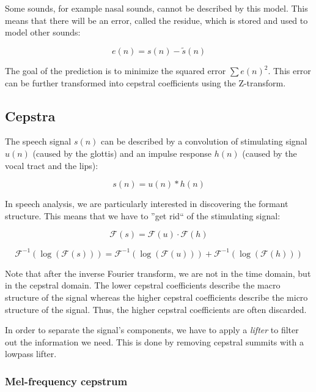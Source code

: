 \documentclass[11pt]{article}
\begin{document}
Some sounds, for example nasal sounds, cannot be described by this model. This means that there will be an error, called the residue, which is stored and used to model other sounds:

\begin{equation}
    e(n) = s(n) - \tilde{s}(n)
\end{equation}

The goal of the prediction is to minimize the squared error $\sum e(n)^2$. This error can be further transformed into cepstral coefficients using the Z-transform.

\subsection{Cepstra}

The speech signal $s(n)$ can be described by a convolution of stimulating signal $u(n)$ (caused by the glottis) and an impulse response $h(n)$ (caused by the vocal tract and the lips):

\begin{equation}
    s(n) = u(n) \ast h(n)
\end{equation}

In speech analysis, we are particularly interested in discovering the formant structure. This means that we have to ''get rid`` of the stimulating signal:

\begin{equation}
    \mathcal{F}(s) = \mathcal{F}(u) \cdot \mathcal{F}(h)
\end{equation}

\begin{equation}
    \mathcal{F}^{-1}(\log(\mathcal{F}(s))) = \mathcal{F}^{-1}(\log(\mathcal{F}(u))) + \mathcal{F}^{-1}(\log(\mathcal{F}(h)))
\end{equation}

Note that after the inverse Fourier transform, we are not in the time domain, but in the cepstral domain. The lower cepstral coefficients describe the macro structure of the signal whereas the higher cepstral coefficients describe the micro structure of the signal. Thus, the higher cepstral coefficients are often discarded.

In order to separate the signal's components, we have to apply a \textit{lifter} to filter out the information we need. This is done by removing cepstral summits with a lowpass lifter.

\subsubsection{Mel-frequency cepstrum}
\end{document}
